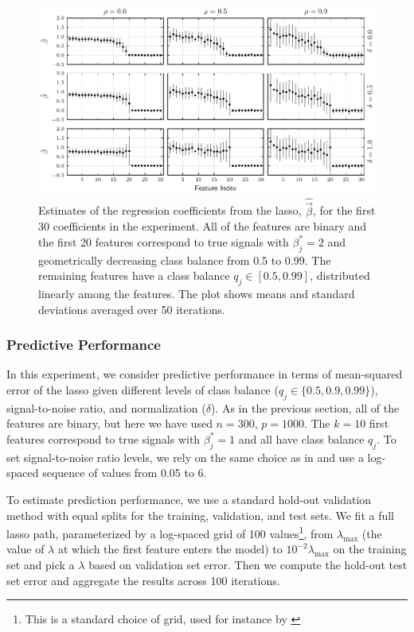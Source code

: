 \begin{figure}[htpb]
  \centering
  \includegraphics[]{plots/binary_decreasing.pdf}
  \caption{%
    Estimates of the regression coefficients from the lasso, \(\hat{\vec{\beta}}\), for the
    first 30 coefficients in the experiment. All of the features are binary and the first 20
    features correspond to true signals with \(\beta_j^* = 2\) and geometrically decreasing
    class balance from 0.5 to 0.99. The remaining features have a class balance \(q_j \in [0.5,
      0.99]\), distributed linearly among the features. The plot shows means and standard
    deviations averaged over 50 iterations.} \label{fig:binary-decreasing}
\end{figure}

\subsubsection{Predictive Performance}\label{sec:predictive-performance}

In this experiment, we consider predictive performance in terms of mean-squared error of
the lasso given different levels of class balance (\(q_j \in \{0.5, 0.9, 0.99\}\)),
signal-to-noise ratio, and normalization (\(\delta\)). As in the previous section, all of
the features are binary, but here we have used \(n=300\), \(p = \num{1000}\). The \(k=10\)
first features correspond to true signals with \(\beta^*_j = 1\) and all have class balance
\(q_j\). To set signal-to-noise ratio levels, we rely on the same choice as in
\citet{hastie2020} and use a log-spaced sequence of values from 0.05 to 6.

To estimate prediction performance, we use a standard hold-out validation method with equal
splits for the training, validation, and test sets. We fit a full lasso path, parameterized
by a log-spaced grid of 100 values\footnote{This is a standard choice of grid, used for
  instance by \citet{friedman2010}}, from \(\lambda_\text{max}\) (the value of \(\lambda\) at
which the first feature enters the model) to \(10^{-2}\lambda_\text{max}\) on the training
set and pick a \(\lambda\) based on validation set error. Then we compute the hold-out test
set error and aggregate the results across 100 iterations.

